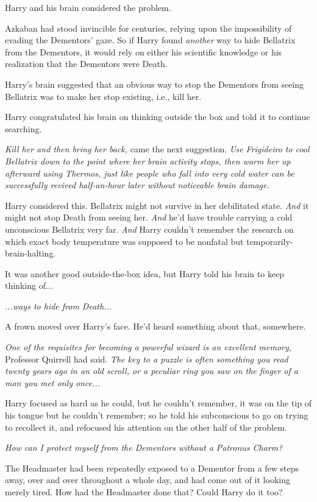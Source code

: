 Harry and his brain considered the problem.

Azkaban had stood invincible for centuries, relying upon the impossibility of evading the Dementors’ gaze. So if Harry found \emph{another} way to hide Bellatrix from the Dementors, it would rely on either his scientific knowledge or his realization that the Dementors were Death.

Harry’s brain suggested that an obvious way to stop the Dementors from seeing Bellatrix was to make her stop existing, i.e., kill her.

Harry congratulated his brain on thinking outside the box and told it to continue searching.

\emph{Kill her and then bring her back,} came the next suggestion. \emph{Use Frigideiro to cool Bellatrix down to the point where her brain activity stops, then warm her up afterward using Thermos, just like people who fall into very cold water can be successfully revived half-an-hour later without noticeable brain damage.}

Harry considered this. Bellatrix might not survive in her debilitated state. \emph{And} it might not stop Death from seeing her. \emph{And} he’d have trouble carrying a cold unconscious Bellatrix very far. \emph{And} Harry couldn’t remember the research on which exact body temperature was supposed to be nonfatal but temporarily-brain-halting.

It was another good outside-the-box idea, but Harry told his brain to keep thinking of...

\emph{...ways to hide from Death...}

A frown moved over Harry’s face. He’d heard something about that, somewhere.

\emph{One of the requisites for becoming a powerful wizard is an excellent memory,} Professor Quirrell had said.\emph{ The key to a puzzle is often something you read twenty years ago in an old scroll, or a peculiar ring you saw on the finger of a man you met only once...}

Harry focused as hard as he could, but he couldn’t remember, it was on the tip of his tongue but he couldn’t remember; so he told his subconscious to go on trying to recollect it, and refocused his attention on the other half of the problem.

\emph{How can I protect myself from the Dementors without a Patronus Charm?}

The Headmaster had been repeatedly exposed to a Dementor from a few steps away, over and over throughout a whole day, and had come out of it looking merely tired. How had the Headmaster done that? Could Harry do it too?


